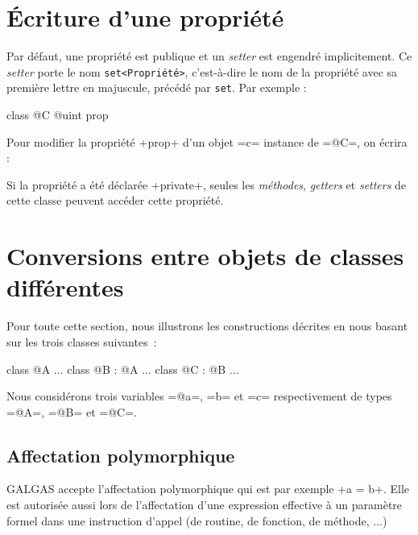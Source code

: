 \section{Écriture d'une propriété}

Par défaut, une propriété est publique et un \emph{setter} est engendré implicitement. Ce \emph{setter} porte le nom \texttt{set<Propriété>}, c'est-à-dire le nom de la propriété avec sa première lettre en majuscule, précédé par \texttt{set}. Par exemple :

\begin{galgas}
class @C {
  @uint prop
}
\end{galgas}


Pour modifier la propriété \ggs+prop+ d'un objet \ggs=c= instance de \ggs=@C=, on écrira :

\begin{galgas}
[!?c setProp !12]
\end{galgas}

Si la propriété a été déclarée \ggs+private+, seules les \emph{méthodes}, \emph{getters} et \emph{setters} de cette classe peuvent accéder cette propriété.












\section{Conversions entre objets de classes différentes}

Pour toute cette section, nous illustrons les constructions décrites en nous basant sur les trois classes suivantes~:
\begin{galgas}
class @A {
  ...
}
class @B : @A {
  ...
}
class @C : @B {
  ...
}
\end{galgas}

Nous considérons trois variables \ggs=@a=, \ggs=b= et \ggs=c= respectivement de types \ggs=@A=, \ggs=@B= et \ggs=@C=.


\subsection{Affectation polymorphique}

GALGAS accepte l'affectation polymorphique qui est par exemple \ggs+a = b+. Elle est autorisée aussi lors de l'affectation d'une expression effective à un paramètre formel dans une instruction d'appel (de routine, de fonction, de méthode, ...)


